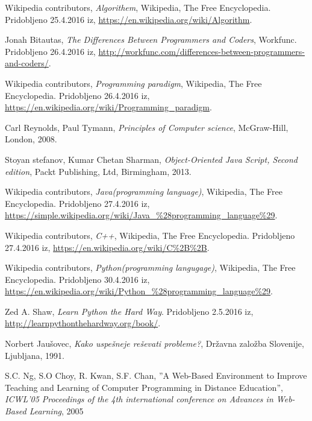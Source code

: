 \begin{thebibliography}{100}
 Wikipedia contributors, \emph{Algorithem},
  Wikipedia, The Free Encyclopedia. Pridobljeno 25.4.2016 iz,
  \url{https://en.wikipedia.org/wiki/Algorithm}.

 Jonah Bitautas, \emph{The Differences Between
    Programmers and Coders}, Workfunc. Pridobljeno 26.4.2016 iz,
  \url{http://workfunc.com/differences-between-programmers-and-coders/}.

 Wikipedia contributors, \emph{Programming paradigm}, Wikipedia, The Free Encyclopedia. Pridobljeno
  26.4.2016 iz,
  \url{https://en.wikipedia.org/wiki/Programming_paradigm}.

 Carl Reynolds, Paul Tymann, \emph{Principles of Computer science},
  McGraw-Hill, London, 2008.

 Stoyan stefanov, Kumar Chetan Sharman, \emph{Object-Oriented Java Script,
    Second edition}, Packt Publishing, Ltd, Birmingham, 2013.

 Wikipedia contributors, \emph{Java(programming
    language)}, Wikipedia, The Free Encyclopedia. Pridobljeno
  27.4.2016 iz,
  \url{https://simple.wikipedia.org/wiki/Java_%28programming_language%29}.

 Wikipedia contributors, \emph{C++}, Wikipedia, The
  Free Encyclopedia. Pridobljeno 27.4.2016 iz,
  \url{https://en.wikipedia.org/wiki/C%2B%2B}.

 Wikipedia contributors, \emph{Python(programming
    langugage)}, Wikipedia, The
  Free Encyclopedia. Pridobljeno 30.4.2016 iz,
  \url{https://en.wikipedia.org/wiki/Python_%28programming_language%29}.

 Zed A. Shaw, \emph{Learn Python the Hard Way}. Pridobljeno 2.5.2016
  iz, \url{http://learnpythonthehardway.org/book/}.

 Norbert Jaušovec, \emph{Kako uspešneje
    reševati probleme?}, Državna založba Slovenije, Ljubljana, 1991.


 S.C. Ng, S.O Choy, R. Kwan, S.F. Chan,
  ''A Web-Based Environment to Improve Teaching and Learning of
  Computer Programming in Distance Education'', \emph{ICWL'05
    Proceedings of the 4th international conference on Advances in
    Web-Based Learning}, 2005


\end{thebibliography}
